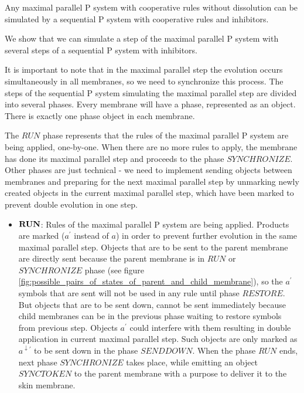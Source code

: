 \begin{veta}
  Any maximal parallel P system with cooperative rules without dissolution can be simulated by a sequential P system with cooperative rules and inhibitors.
\end{veta}

\begin{dokaz}
  We show that we can simulate a step of the maximal parallel P system with several steps of a sequential P system with inhibitors.


  It is important to note that in the maximal parallel step the evolution occurs simultaneously in all membranes, so we need to synchronize this process.
  The steps of the sequential P system simulating the maximal parallel step are divided into several phases. Every membrane will have a phase, represented as an object. There is exactly one phase object in each membrane. 

  The $\mathit{RUN}$ phase represents that the rules of the maximal parallel P system are being applied, one-by-one. When there are no more rules to apply, the membrane has done its maximal parallel step and proceeds to the phase $\mathit{SYNCHRONIZE}$. Other phases are just technical - we need to implement sending objects between membranes and preparing for the next maximal parallel step by unmarking newly created objects in the current maximal parallel step, which have been marked to prevent double evolution in one step.

  \begin{itemize}
    \item $\mathit{\bf RUN}$: Rules of the maximal parallel P system are being applied. Products are marked ($a^\prime$ instead of $a$) in order to prevent further evolution in the same maximal parallel step. Objects that are to be sent to the parent membrane are directly sent because the parent membrane is in $\mathit{RUN}$ or $\mathit{SYNCHRONIZE}$ phase (see figure \ref{fig:possible_pairs_of_states_of_parent_and_child_membrane}), so the $a^{\prime}$ symbols that are sent will not be used in any rule until phase $\mathit{RESTORE}$. But objects that are to be sent down, cannot be sent immediately because child membranes can be in the previous phase waiting to restore symbols from previous step. Objects $a^\prime$ could interfere with them resulting in double application in current maximal parallel step. Such objects are only marked as $a^{\downarrow\prime}$ to be sent down in the phase $\mathit{SENDDOWN}$. When the phase $\mathit{RUN}$ ends, next phase $\mathit{SYNCHRONIZE}$ takes place, while emitting an object $\mathit{SYNCTOKEN}$ to the parent membrane with a purpose to deliver it to the skin membrane.


\end{itemize}
\end{dokaz}
